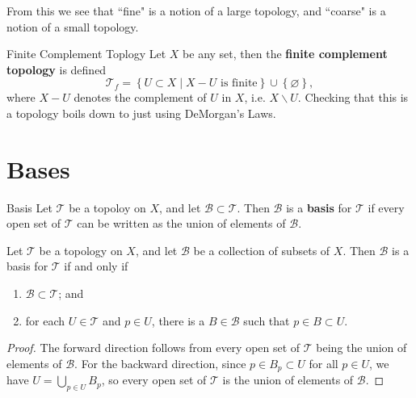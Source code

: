 \documentclass[10pt]{report}
\begin{document}
From this we see that ``fine" is a notion of a large topology, and ``coarse" is a notion of a small topology.

\begin{ex}{Finite Complement Toplogy}{}
	Let $X$ be any set, then the \textbf{finite complement topology} is defined
	\[
		\mathcal{T}_f = \left\{ U \subset X \;|\; X-U \text{ is finite} \right\} \cup\left\{ \varnothing \right\},
	\] 
	where $X-U$ denotes the complement of $U$ in $X$, i.e. $X \backslash U$. Checking that this is a topology boils down to just using DeMorgan's Laws.
\end{ex}


\section{Bases}

\begin{defn}{Basis}{}
Let $\mathcal{T}$ be a topoloy on $X$, and let $\mathcal{B} \subset \mathcal{T}$. Then $\mathcal{B}$ is a \textbf{basis} for $\mathcal{T}$ if every open set of $\mathcal{T}$ can be written as the union of elements of $\mathcal{B}$.
\end{defn}

\begin{prop}
\label{prop:basis-specific-top}
Let $\mathcal{T}$ be a topology on $X$, and let $\mathcal{B}$ be a collection of subsets of $X$. Then $\mathcal{B}$ is a basis for $\mathcal{T}$ if and only if
\begin{enumerate}
	\item $\mathcal{B}\subset \mathcal{T}$; and
	\item for each $U \in \mathcal{T}$ and $p \in U$, there is a $B \in \mathcal{B}$ such that $p \in B \subset U$.
\end{enumerate}
\end{prop}
\begin{proof}
	The forward direction follows from every open set of $\mathcal{T}$ being the union of elements of $\mathcal{B}$. For the backward direction, since $p \in B_p \subset U$ for all $p \in U$, we have $U = \bigcup_{p\in U}B_p$, so every open set of $\mathcal{T}$ is the union of elements of $\mathcal{B}$.
\end{proof}
\end{document}
